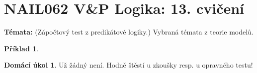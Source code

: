 \documentclass[a4paper]{article}
\theoremstyle{definition}
\newtheorem{problem}{Příklad}
\newtheorem*{ukol}{Domácí úkol}
\begin{document}
\section*{NAIL062 V\&P Logika: 13. cvičení}


\textbf{Témata:}
(Zápočtový test z predikátové logiky.) Vybraná témata z teorie modelů.


\medskip\begin{problem}
 
\end{problem}


\medskip\begin{ukol}
Už žádný není. Hodně štěstí u zkoušky resp. u opravného testu!
\end{ukol}
\end{document}
